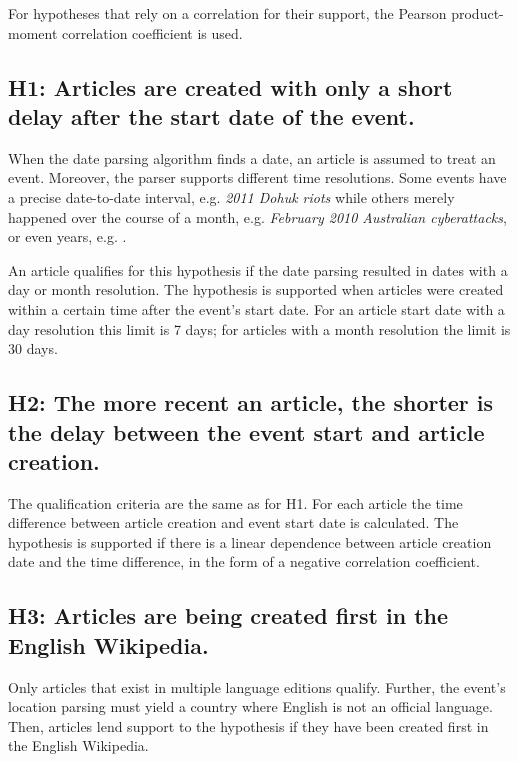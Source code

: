 For hypotheses that rely on a correlation for their support, the Pearson product-moment correlation coefficient is used.

\subsection*{H1: Articles are created with only a short delay after the start date of the event.}

When the date parsing algorithm finds a date, an article is assumed to treat an event.
Moreover, the parser supports different time resolutions.
Some events have a precise date-to-date interval, e.g. \emph{2011 Dohuk riots} while others merely happened over the course of a month, e.g. \emph{February 2010 Australian cyberattacks}, or even years, e.g. .

An article qualifies for this hypothesis if the date parsing resulted in dates with a day or month resolution.
The hypothesis is supported when articles were created within a certain time after the event's start date.
For an article start date with a day resolution this limit is 7 days; for articles with a month resolution the limit is 30 days.

\subsection*{H2: The more recent an article, the shorter is the delay between the event start and article creation.}

The qualification criteria are the same as for H1. 
For each article the time difference between article creation and event start date is calculated. 
The hypothesis is supported if there is a linear dependence between article creation date and the time difference, in the form of a negative correlation coefficient.

\subsection*{H3: Articles are being created first in the English Wikipedia.}

Only articles that exist in multiple language editions qualify.
Further, the event's location parsing must yield a country where English is not an official language.
Then, articles lend support to the hypothesis if they have been created first in the English Wikipedia.

